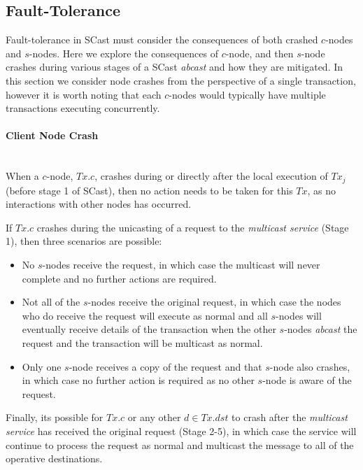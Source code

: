 	\subsection{Fault-Tolerance}
	Fault-tolerance in \textsf{SCast} must consider the consequences of both crashed $c$-nodes and $s$-nodes.  Here we explore the consequences of $c$-node, and then $s$-node crashes during various stages of a \textsf{SCast} \emph{abcast} and how they are mitigated.  In this section we consider node crashes from the perspective of a single transaction, however it is worth noting that each $c$-nodes would typically have multiple transactions executing concurrently.  
	
	\paragraph{Client Node Crash} \hspace{0pt} \\
	When a $c$-node, $Tx.c$, crashes during or directly after the local execution of $Tx_j$ (before stage 1 of \textsf{SCast}), then no action needs to be taken for this $Tx$, as no interactions with other nodes has occurred.  
	
    If $Tx.c$ crashes during the unicasting of a request to the \emph{multicast service}  (Stage 1), then three scenarios are possible: 
    \begin{itemize}
	    \item    No $s$-nodes receive the request, in which case the multicast will never complete and no further actions are required.
	    \item    Not all of the $s$-nodes receive the original request, in which case the nodes who do receive the request will execute as normal and all $s$-nodes will eventually receive details of the transaction when the other $s$-nodes \emph{abcast} the request and the transaction will be multicast as normal.  
	    \item    Only one $s$-node receives a copy of the request and that $s$-node also crashes, in which case no further action is required as no other $s$-node is aware of the request.  
    \end{itemize}        	
	
    Finally, its possible for $Tx.c$ or any other $d \in Tx.dst$ to crash after the \emph{multicast service} has received the original request (Stage 2-5), in which case the service will continue to process the request as normal and multicast the message to all of the operative destinations.  
	    
